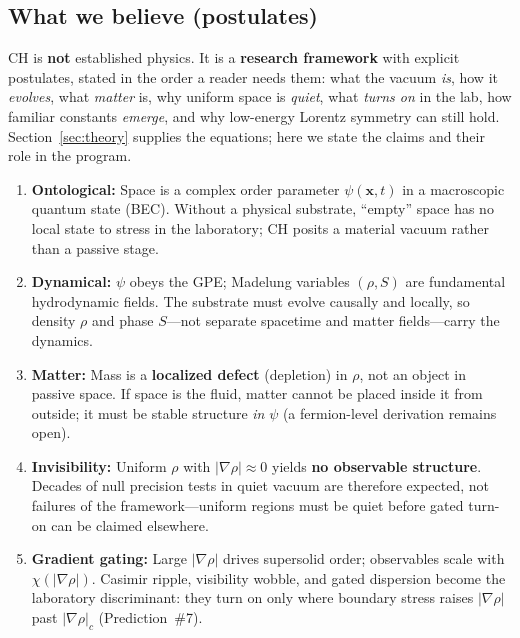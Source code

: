 \documentclass[11pt,a4paper]{article}
\begin{document}
\subsection{What we believe (postulates)}

CH is \textbf{not} established physics.
It is a \textbf{research framework} with explicit postulates, stated in the order a reader needs them: what the vacuum \emph{is}, how it \emph{evolves}, what \emph{matter} is, why uniform space is \emph{quiet}, what \emph{turns on} in the lab, how familiar constants \emph{emerge}, and why low-energy Lorentz symmetry can still hold.
Section~\ref{sec:theory} supplies the equations; here we state the claims and their role in the program.

\begin{enumerate}[label=\textbf{\arabic*.}, leftmargin=*]
  \item \textbf{Ontological:} Space is a complex order parameter $\psi(\mathbf{x},t)$ in a macroscopic quantum state (BEC).
  Without a physical substrate, ``empty'' space has no local state to stress in the laboratory; CH posits a material vacuum rather than a passive stage.

  \item \textbf{Dynamical:} $\psi$ obeys the GPE; Madelung variables $(\rho, S)$ are fundamental hydrodynamic fields.
  The substrate must evolve causally and locally, so density $\rho$ and phase $S$---not separate spacetime and matter fields---carry the dynamics.

  \item \textbf{Matter:} Mass is a \textbf{localized defect} (depletion) in $\rho$, not an object in passive space.
  If space is the fluid, matter cannot be placed inside it from outside; it must be stable structure \emph{in} $\psi$ (a fermion-level derivation remains open).

  \item \textbf{Invisibility:} Uniform $\rho$ with $|\nabla\rho| \approx 0$ yields \textbf{no observable structure}.
  Decades of null precision tests in quiet vacuum are therefore expected, not failures of the framework---uniform regions must be quiet before gated turn-on can be claimed elsewhere.

  \item \textbf{Gradient gating:} Large $|\nabla\rho|$ drives supersolid order; observables scale with $\chi(|\nabla\rho|)$.
  Casimir ripple, visibility wobble, and gated dispersion become the laboratory discriminant: they turn on only where boundary stress raises $|\nabla\rho|$ past $|\nabla\rho|_c$ (Prediction~\#7).


\end{enumerate}
\end{document}
